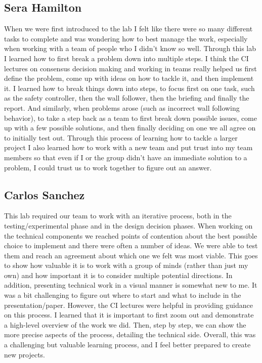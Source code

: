 \documentclass{article}
\begin{document}
\subsection*{Sera Hamilton}
When we were first introduced to the lab I felt like there were so many different tasks to complete and was wondering how to best manage the work, especially when working with a team of people who I didn't know so well. Through this lab I learned how to first break a problem down into multiple steps. I think the CI lectures on consensus decision making and working in teams really helped us first define the problem, come up with ideas on how to tackle it, and then implement it. I learned how to break things down into steps, to focus first on one task, such as the safety controller, then the wall follower, then the briefing and finally the report. And similarly, when problems arose (such as incorrect wall following behavior), to take a step back as a team to first break down possible issues, come up with a few possible solutions, and then finally deciding on one we all agree on to initially test out. Through this process of learning how to tackle a larger project I also learned how to work with a new team and put trust into my team members so that even if I or the group didn't have an immediate solution to a problem, I could trust us to work together to figure out an answer.

\subsection*{Carlos Sanchez}
This lab required our team to work with an iterative process, both in the testing/experimental phase and in the design decision phases. When working on the technical components we reached points of contention about the best possible choice to implement and there were often a number of ideas. We were able to test them and reach an agreement about which one we felt was most viable. This goes to show how valuable it is to work with a group of minds (rather than just my own) and how important it is to consider multiple potential directions. In addition, presenting technical work in a visual manner is somewhat new to me. It was a bit challenging to figure out where to start and what to include in the presentation/paper. However, the CI lectures were helpful in providing guidance on this process. I learned that it is important to first zoom out and demonstrate a high-level overview of the work we did. Then, step by step, we can show the more precise aspects of the process, detailing the technical side. Overall, this was a challenging but valuable learning process, and I feel better prepared to create new projects.
\end{document}

